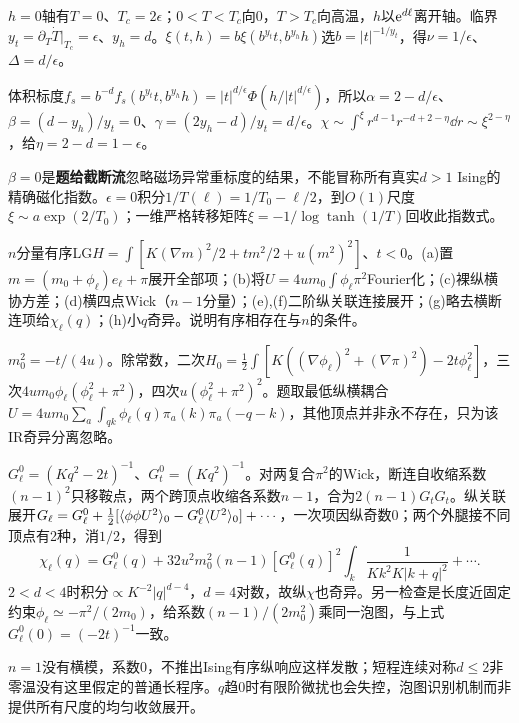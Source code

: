\begin{solution}
$h=0$轴有$T=0$、$T_c=2\epsilon$；$0<T<T_c$向0，$T>T_c$向高温，$h$以$\mathrm e^{d\ell}$离开轴。临界$y_t=\partial_T\dot T|_{T_c}=\epsilon$、$y_h=d$。$\xi(t,h)=b\xi(b^{y_t}t,b^{y_h}h)$选$b=|t|^{-1/y_t}$，得$\nu=1/\epsilon$、$\Delta=d/\epsilon$。

体积标度$f_s=b^{-d}f_s(b^{y_t}t,b^{y_h}h)=|t|^{d/\epsilon}\Phi(h/|t|^{d/\epsilon})$，所以$\alpha=2-d/\epsilon$、$\beta=(d-y_h)/y_t=0$、$\gamma=(2y_h-d)/y_t=d/\epsilon$。$\chi\sim\int^{\xi}r^{d-1}r^{-d+2-\eta}\dd r\sim\xi^{2-\eta}$，给$\eta=2-d=1-\epsilon$。

$\beta=0$是\textbf{题给截断流}忽略磁场异常重标度的结果，不能冒称所有真实$d>1$ Ising的精确磁化指数。$\epsilon=0$积分$1/T(\ell)=1/T_0-\ell/2$，到$O(1)$尺度$\xi\sim a\exp(2/T_0)$；一维严格转移矩阵$\xi=-1/\log\tanh(1/T)$回收此指数式。
\end{solution}
\begin{exercise}[原题3(a)--(h)]\label{r:334-2-3}
$n$分量有序LG$H=\int[K(\nabla m)^2/2+tm^2/2+u(m^2)^2]$、$t<0$。(a)置$m=(m_0+\phi_\ell)e_\ell+\pi$展开全部项；(b)将$U=4um_0\int\phi_\ell\pi^2$Fourier化；(c)裸纵横协方差；(d)横四点Wick（$n-1$分量）；(e),(f)二阶纵关联连接展开；(g)略去横断连项给$\chi_\ell(q)$；(h)小$q$奇异。说明有序相存在与$n$的条件。
\end{exercise}
\begin{solution}
$m_0^2=-t/(4u)$。除常数，二次$H_0=\tfrac12\int[K((\nabla\phi_\ell)^2+(\nabla\pi)^2)-2t\phi_\ell^2]$，三次$4um_0\phi_\ell(\phi_\ell^2+\pi^2)$，四次$u(\phi_\ell^2+\pi^2)^2$。题取最低纵横耦合$U=4um_0\sum_a\int_{qk}\phi_\ell(q)\pi_a(k)\pi_a(-q-k)$，其他顶点并非永不存在，只为该IR奇异分离忽略。

$G_\ell^0=(Kq^2-2t)^{-1}$、$G_t^0=(Kq^2)^{-1}$。对两复合$\pi^2$的Wick，断连自收缩系数$(n-1)^2$只移鞍点，两个跨顶点收缩各系数$n-1$，合为$2(n-1)G_tG_t$。纵关联展开$G_\ell=G_\ell^0+\tfrac12[\langle \phi\phi U^2\rangle_0-G_\ell^0\langle U^2\rangle_0]+\cdots$，一次项因纵奇数0；两个外腿接不同顶点有2种，消$1/2$，得到
\begin{equation}
\chi_\ell(q)=G_\ell^0(q)+32u^2m_0^2(n-1)[G_\ell^0(q)]^2\int_k\frac1{Kk^2K|k+q|^2}+\cdots.
\end{equation}
$2<d<4$时积分$\propto K^{-2}|q|^{d-4}$，$d=4$对数，故纵$\chi$也奇异。另一检查是长度近固定约束$\phi_\ell\simeq-\pi^2/(2m_0)$，给系数$(n-1)/(2m_0^2)$乘同一泡图，与上式$G_\ell^0(0)=(-2t)^{-1}$一致。

$n=1$没有横模，系数0，不推出Ising有序纵响应这样发散；短程连续对称$d\le2$非零温没有这里假定的普通长程序。$q$趋0时有限阶微扰也会失控，泡图识别机制而非提供所有尺度的均匀收敛展开。
\end{solution}
